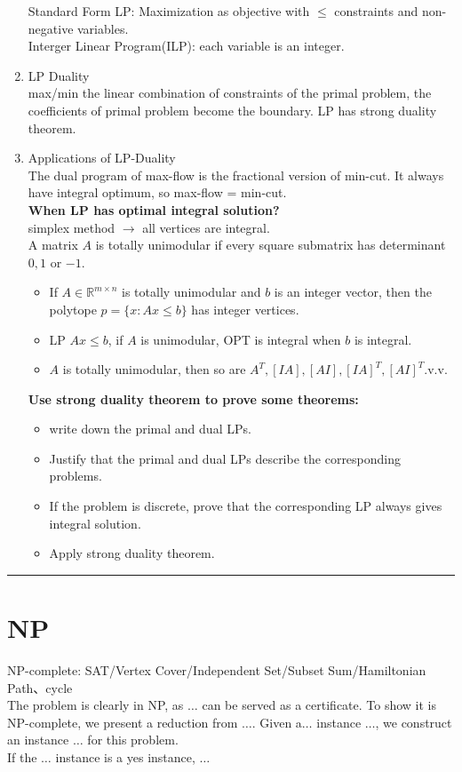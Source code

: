 \documentclass[10pt, a4paper, twocolumn]{article}
\begin{document}
\begin{enumerate}[leftmargin = 12pt, topsep = 0pt, itemsep=0pt, partopsep = 0pt]
        Standard Form LP: Maximization as objective with $\leq$ constraints and non-negative variables.\\
        Interger Linear Program(ILP): each variable is an integer.
    \item LP Duality\\
        max/min the linear combination of constraints of the primal problem, the coefficients of primal problem become the boundary. LP has strong duality theorem.
    \item Applications of LP-Duality\\
        The dual program of max-flow is the fractional version of min-cut. It always have integral optimum, so max-flow = min-cut.\\
        \textbf{When LP has optimal integral solution?}\\
        simplex method $\to$ all vertices are integral.\\
        A matrix $A$ is totally unimodular if every square submatrix has determinant $0,1$ or $-1$.
        \begin{itemize}[leftmargin = 12pt, topsep = 0pt, itemsep=0pt, partopsep = 0pt]
        \item If $A\in \mathbb{R}^{m\times n}$ is totally unimodular     and $b$ is an integer vector, then the polytope             $p=\{x:Ax\leq b\}$ has integer vertices.
        \item LP $Ax\leq b$, if $A$ is unimodular, OPT is integral when $b$ is integral.
        \item $A$ is totally unimodular, then so are $A^T,[I A],[AI],[I A]^T,[AI]^T$.v.v.
        \end{itemize}
        \textbf{Use strong duality theorem to prove some theorems: }
        \begin{itemize}[leftmargin = 12pt, topsep = 0pt, itemsep=0pt, partopsep = 0pt]
        \item write down the primal and dual LPs.
        \item Justify that the primal and dual LPs describe the corresponding problems.
        \item If the problem is discrete, prove that the corresponding LP always gives integral solution.
        \item Apply strong duality theorem.
        \end{itemize}
\end{enumerate}
\vspace{0.1cm}
\hrule
\section{NP}
NP-complete: SAT/Vertex Cover/Independent Set/Subset Sum/Hamiltonian Path、cycle\\
The problem is clearly in NP, as $\dots$ can be served as a certificate. To show it is NP-complete, we present a reduction from $\dots$. Given a$\dots$ instance $\dots$, we construct an instance $\dots$ for this problem.\\
If the $\dots$ instance is a yes instance, $\dots$\\
\end{document}

